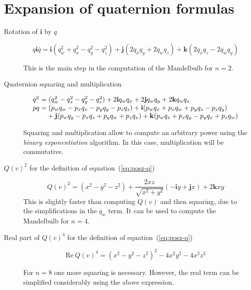 \documentclass{article}
\let\vec\mathbf
\newcommand{\mathnewlineeq}[1][\quad]{\\\phantom{#1 = }}
\begin{document}
\newpage
\appendix
\section{Expansion of quaternion formulas}

\begin{description}
\item[Rotation of $\vec{i}$ by $q$]
\begin{equation*}
q\vec{i}\bar q =
  \vec{i}(q_w^2+q_x^2-q_y^2-q_z^2) + \vec{j} (2q_x q_y + 2q_w q_z)
  + \vec{k} (2 q_x q_z - 2 q_w q_y)
\end{equation*}

\noindent This is the main step in the computation of the Mandelbulb
for $n=2$.

\bigskip
\item[Quaternion squaring and multiplication]
\begin{equation*}
\begin{array}{l}
\hbox to 0pt{$q^2\hss$}\phantom{p q} =
  (q_w^2-q_x^2-q_y^2-q_z^2) + 2 \vec{i} q_w q_x + 2 \vec{j} q_w q_y
  + 2 \vec{k} q_w q_z\\
p q =       (p_w q_w - p_x q_x - p_y q_y - p_z q_z)
  + \vec{i} (p_w q_x + p_x q_w + p_y q_z - p_z q_y) \mathnewlineeq[p q]
  + \vec{j} (p_w q_y - p_x q_z + p_y q_w + p_z q_x)
  + \vec{k} (p_w q_z + p_x q_y - p_y q_x + p_z q_w)
\end{array}
\end{equation*}

\noindent
Squaring and multiplication allow to compute an arbitrary power using
the \emph{binary exponentiation} algorithm.  In this case, multiplication
will be commutative.

\bigskip
\item[$Q(v)^2$ for the definition of equation~(\ref{eq:posz-q})]
\begin{equation*}
Q(v)^2 =
  (x^2-y^2-z^2) + \frac{2xz}{\sqrt{x^2+y^2}} (-\vec{i} y + \vec{j} x)
  + 2\vec{k}xy
\end{equation*}
\noindent This is slightly faster than computing $Q(v)$ and then squaring,
due to the simplifications in the $q_w$ term.  It can be used to compute
the Mandelbulb for $n=4$.

\bigskip
\item[Real part of $Q(v)^4$ for the definition of equation~(\ref{eq:posz-q})]
\begin{equation*}
\mathrm{Re}~Q(v)^4 = (x^2-y^2-z^2)^2 - 4x^2 y^2 -4 x^2 z^2
\end{equation*}

For $n=8$ one more squaring is necessary.  However, the real term can
be simplified considerably using the above expression.
\end{description}
\end{document}
